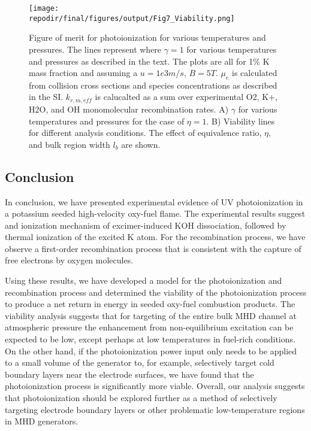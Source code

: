 \begin{figure}[h]
    \centering
    \texttt{[image: \\repodir/final/figures/output/Fig7\_Viability.png]} 
    \caption{Figure of merit for photoionization for various temperatures and pressures. The lines represent where $\gamma = 1$ for various temperatures and pressures as described in the text.   The plots are all for 1\% K mass fraction and assuming a $u=1e3 m/s$, $B=5T$. $\mu_e$ is calculated from collision cross sections and species concentrations as described in the SI. $k_{r,m,eff}$ is calucalted as a sum over experimental O2, K+, H2O,
and OH monomolecular recombination rates. A) $\gamma$ for various temperatures and pressures for the case of $\eta=1$. B) Viability lines for different analysis conditions. The effect of equivalence ratio, $\eta$, and bulk region width $l_b$ are shown.}
    \label{fig:viability_gamma}
\end{figure}



\subsection{Conclusion}

In conclusion, we have presented experimental evidence of UV photoionization in a potassium seeded high-velocity oxy-fuel flame. The experimental results suggest and ionization mechanism of excimer-induced KOH dissociation, followed by thermal ionization of the excited K atom. For the recombination process, we have observe a first-order recombination process that is consistent with the capture of free electrons by oxygen molecules. 

Using these results, we have developed a model for the photoionization and recombination process and determined the viability of the photoionization process to produce a net return in energy in seeded oxy-fuel combustion products. The viability analysis suggests that for targeting of the entire bulk MHD channel at atmospheric pressure the enhancement from non-equilibrium excitation can be expected to be low, except perhaps at low temperatures in fuel-rich conditions. On the other hand, if the photoionization power input only needs to be applied to a small volume of the generator to, for example, selectively target cold boundary layers near the electrode surfaces, we have found that the photoionization process is significantly more viable. Overall, our analysis suggests that photoionization should be explored further as a method of selectively targeting electrode boundary layers or other problematic low-temperature regions in MHD generators.